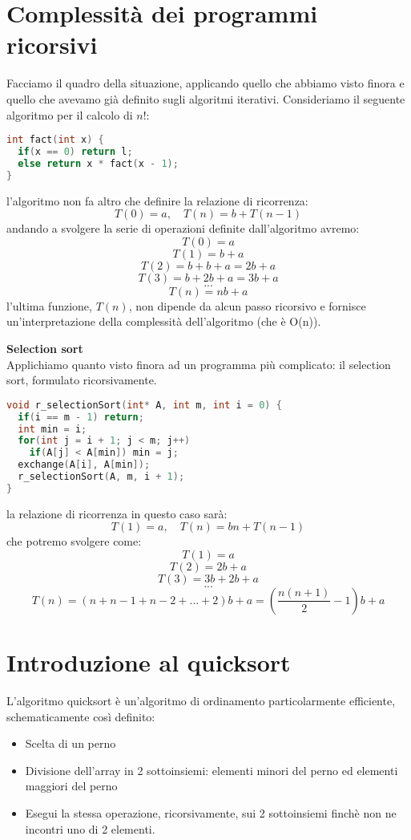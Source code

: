 \documentclass[a4paper,12pt]{article}
\begin{document}
\section{Complessità dei programmi ricorsivi}
Facciamo il quadro della situazione, applicando quello che abbiamo visto finora e quello che avevamo già definito
sugli algoritmi iterativi. Consideriamo il seguente algoritmo per il calcolo di $n!$:
\begin{lstlisting}[language=C++]
int fact(int x) {
  if(x == 0) return l;
  else return x * fact(x - 1);
}
\end{lstlisting}
l'algoritmo non fa altro che definire la relazione di ricorrenza:
$$ T(0) = a, \quad T(n) = b + T(n - 1) $$
andando a svolgere la serie di operazioni definite dall'algoritmo avremo:
$$ T(0) = a $$
$$ T(1) = b + a $$
$$ T(2) = b + b + a = 2b + a $$
$$ T(3) = b + 2b + a = 3b + a $$
$$ ... $$
$$ T(n) = nb + a $$
l'ultima funzione, $T(n)$, non dipende da alcun passo ricorsivo e fornisce un'interpretazione della complessità
dell'algoritmo (che è O(n)).
\par\smallskip
\textbf{Selection sort} \\
Applichiamo quanto visto finora ad un programma più complicato: il selection sort, formulato ricorsivamente.
\begin{lstlisting}[language=C++]
void r_selectionSort(int* A, int m, int i = 0) {
  if(i == m - 1) return;
  int min = i;
  for(int j = i + 1; j < m; j++)
    if(A[j] < A[min]) min = j;
  exchange(A[i], A[min]);
  r_selectionSort(A, m, i + 1);
}
\end{lstlisting}

la relazione di ricorrenza in questo caso sarà:
$$ T(1) = a, \quad T(n) = bn + T(n - 1) $$ \newpage
che potremo svolgere come:
$$ T(1) = a $$
$$ T(2) = 2b + a $$
$$ T(3) = 3b + 2b + a $$
$$...$$
$$ T(n) = (n + n-1 + n-2 + ... + 2)b + a = (\frac{n(n+1)}{2} - 1) b + a $$

\section{Introduzione al quicksort}
L'algoritmo quicksort è un'algoritmo di ordinamento particolarmente efficiente, schematicamente così definito:
\begin{itemize}
  \item Scelta di un perno
  \item Divisione dell'array in 2 sottoinsiemi: elementi minori del perno ed elementi maggiori del perno
  \item Esegui la stessa operazione, ricorsivamente, sui 2 sottoinsiemi finchè non ne incontri uno di 2 elementi.
\end{itemize}
\end{document}

